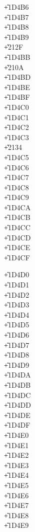 \begin{multicols}{3}
\begin{ssubs}{01}
\U+1D4B6\\  %
\U+1D4B7\\  %
\U+1D4B8\\  %
\U+1D4B9\\  %
\U+212F\\   %
\U+1D4BB\\  %
\U+210A\\   %
\U+1D4BD\\  %
\U+1D4BE\\  %
\U+1D4BF\\  %
\U+1D4C0\\  %
\U+1D4C1\\  %
\U+1D4C2\\  %
\U+1D4C3\\  %
\U+2134\\   %
\U+1D4C5\\  %
\U+1D4C6\\  %
\U+1D4C7\\  %
\U+1D4C8\\  %
\U+1D4C9\\  %
\U+1D4CA\\  %
\U+1D4CB\\  %
\U+1D4CC\\  %
\U+1D4CD\\  %
\U+1D4CE\\  %
\U+1D4CF\\  %
\end{ssubs}

\begin{ssubs}{01}
\U+1D4D0\\  %
\U+1D4D1\\  %
\U+1D4D2\\  %
\U+1D4D3\\  %
\U+1D4D4\\  %
\U+1D4D5\\  %
\U+1D4D6\\  %
\U+1D4D7\\  %
\U+1D4D8\\  %
\U+1D4D9\\  %
\U+1D4DA\\  %
\U+1D4DB\\  %
\U+1D4DC\\  %
\U+1D4DD\\  %
\U+1D4DE\\  %
\U+1D4DF\\  %
\U+1D4E0\\  %
\U+1D4E1\\  %
\U+1D4E2\\  %
\U+1D4E3\\  %
\U+1D4E4\\  %
\U+1D4E5\\  %
\U+1D4E6\\  %
\U+1D4E7\\  %
\U+1D4E8\\  %
\U+1D4E9\\  %
\end{ssubs}


\end{multicols}
